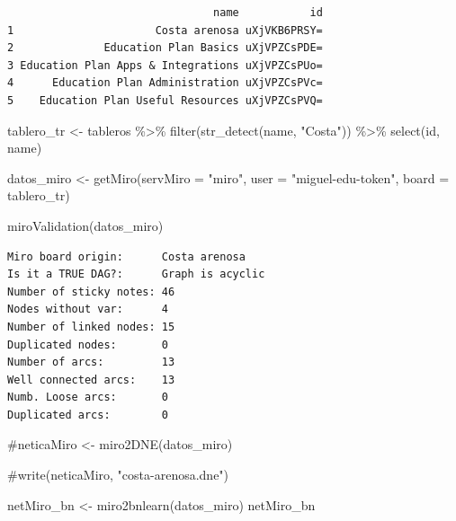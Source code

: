\documentclass[
  letterpaper,
  DIV=11,
  numbers=noendperiod]{scrreprt}
\newenvironment{Shaded}{\begin{snugshade}}{\end{snugshade}}
\newcommand{\AttributeTok}[1]{\textcolor[rgb]{0.40,0.45,0.13}{#1}}
\newcommand{\CommentTok}[1]{\textcolor[rgb]{0.37,0.37,0.37}{#1}}
\newcommand{\FunctionTok}[1]{\textcolor[rgb]{0.28,0.35,0.67}{#1}}
\newcommand{\NormalTok}[1]{\textcolor[rgb]{0.00,0.23,0.31}{#1}}
\newcommand{\OtherTok}[1]{\textcolor[rgb]{0.00,0.23,0.31}{#1}}
\newcommand{\SpecialCharTok}[1]{\textcolor[rgb]{0.37,0.37,0.37}{#1}}
\newcommand{\StringTok}[1]{\textcolor[rgb]{0.13,0.47,0.30}{#1}}
\begin{document}
\begin{verbatim}
                                name           id
1                      Costa arenosa uXjVKB6PRSY=
2              Education Plan Basics uXjVPZCsPDE=
3 Education Plan Apps & Integrations uXjVPZCsPUo=
4      Education Plan Administration uXjVPZCsPVc=
5    Education Plan Useful Resources uXjVPZCsPVQ=
\end{verbatim}

\begin{Shaded}
\begin{Highlighting}[]
\NormalTok{tablero\_tr }\OtherTok{\textless{}{-}}\NormalTok{ tableros }\SpecialCharTok{\%\textgreater{}\%}
              \FunctionTok{filter}\NormalTok{(}\FunctionTok{str\_detect}\NormalTok{(name, }\StringTok{"Costa"}\NormalTok{)) }\SpecialCharTok{\%\textgreater{}\%}
              \FunctionTok{select}\NormalTok{(id, name)}

\NormalTok{datos\_miro }\OtherTok{\textless{}{-}} \FunctionTok{getMiro}\NormalTok{(}\AttributeTok{servMiro =} \StringTok{"miro"}\NormalTok{, }\AttributeTok{user =} \StringTok{"miguel{-}edu{-}token"}\NormalTok{,}
                        \AttributeTok{board =}\NormalTok{ tablero\_tr)}

\FunctionTok{miroValidation}\NormalTok{(datos\_miro)}
\end{Highlighting}
\end{Shaded}

\begin{verbatim}
Miro board origin:      Costa arenosa
Is it a TRUE DAG?:      Graph is acyclic
Number of sticky notes: 46
Nodes without var:      4
Number of linked nodes: 15
Duplicated nodes:       0
Number of arcs:         13
Well connected arcs:    13
Numb. Loose arcs:       0
Duplicated arcs:        0
\end{verbatim}

\begin{Shaded}
\begin{Highlighting}[]
\CommentTok{\#neticaMiro \textless{}{-} miro2DNE(datos\_miro)}

\CommentTok{\#write(neticaMiro, "costa{-}arenosa.dne")}

\NormalTok{netMiro\_bn }\OtherTok{\textless{}{-}} \FunctionTok{miro2bnlearn}\NormalTok{(datos\_miro)}
\NormalTok{netMiro\_bn}
\end{Highlighting}
\end{Shaded}
\end{document}
